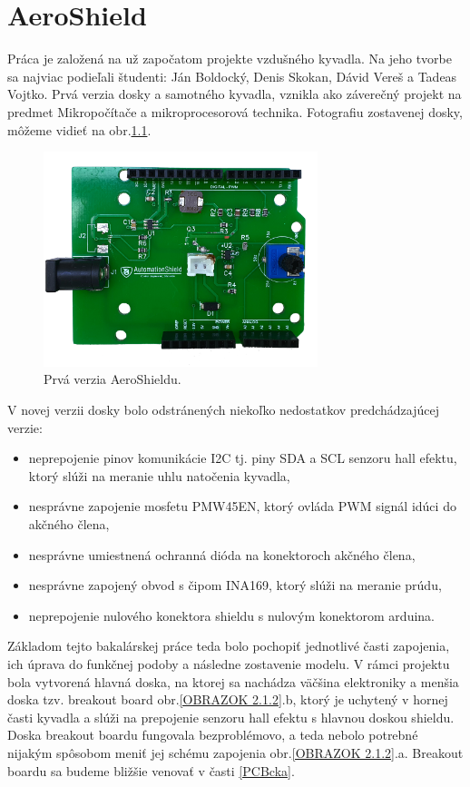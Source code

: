 \chapter{AeroShield}

Práca je založená na už započatom projekte vzdušného kyvadla. Na jeho tvorbe sa najviac podieľali študenti: Ján Boldocký, Denis Skokan, Dávid Vereš a Tadeas Vojtko. Prvá verzia dosky a samotného kyvadla, vznikla ako záverečný projekt na predmet Mikropočítače a mikroprocesorová technika. Fotografiu zostavenej dosky, môžeme vidieť na obr.\ref{OBRAZOK 2.1.1}.


\begin{figure}[tbh]
	\centering
	\includegraphics[width=80mm]{obr/oldshield.png}
	\caption{Prvá verzia AeroShieldu.}\label{OBRAZOK 2.1.1}
\end{figure}


V novej verzii dosky bolo odstránených niekoľko nedostatkov predchádzajúcej verzie:

\begin{itemize}
	\item neprepojenie pinov komunikácie I2C tj. piny SDA a SCL senzoru hall efektu, ktorý slúži na meranie uhlu natočenia kyvadla,
	\item nesprávne zapojenie mosfetu PMW45EN, ktorý ovláda PWM signál idúci do akčného člena,
	\item nesprávne umiestnená ochranná dióda na konektoroch akčného člena,
	\item nesprávne zapojený obvod s čipom INA169, ktorý slúži na meranie prúdu,
	\item neprepojenie nulového konektora shieldu s nulovým konektorom arduina.
\end{itemize}

Základom tejto bakalárskej práce teda bolo pochopiť jednotlivé časti zapojenia, ich úprava do funkčnej podoby a následne zostavenie modelu. V rámci projektu bola vytvorená hlavná doska, na ktorej sa nachádza väčšina elektroniky a menšia doska tzv. breakout board obr.\ref{OBRAZOK 2.1.2}.b, ktorý je uchytený v hornej časti kyvadla a slúži na prepojenie senzoru hall efektu s hlavnou doskou shieldu. Doska breakout boardu fungovala bezproblémovo, a teda nebolo potrebné nijakým spôsobom meniť jej schému zapojenia obr.\ref{OBRAZOK 2.1.2}.a. Breakout boardu sa budeme bližšie venovať v časti \ref{PCBcka}.

